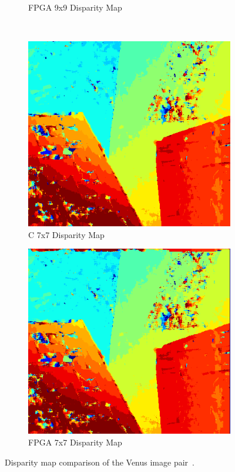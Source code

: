 \begin{figure}
\begin{center}
\begin{subfigure}{0.45\textwidth}
		\caption{FPGA 9x9 Disparity Map}
		\label{fig:venusFPGA9x9}
	\end{subfigure}
	\\
	\begin{subfigure}{0.45\textwidth}
		\includegraphics[width=\textwidth]{figures/venus_c_7x7.png}
		\caption{C 7x7 Disparity Map}
		\label{fig:venusC7x7}
	\end{subfigure}
	\begin{subfigure}{0.45\textwidth}
		\includegraphics[width=\textwidth]{figures/venus_7x7_fpga.png}
		\caption{FPGA 7x7 Disparity Map}
		\label{fig:venusFPGA7x7}
	\end{subfigure}
	\captionfonts
	\caption{Disparity map comparison of the Venus image pair~\cite{middlebury}.}
	\label{fig:venusDispMap}
\end{center}
\end{figure}



